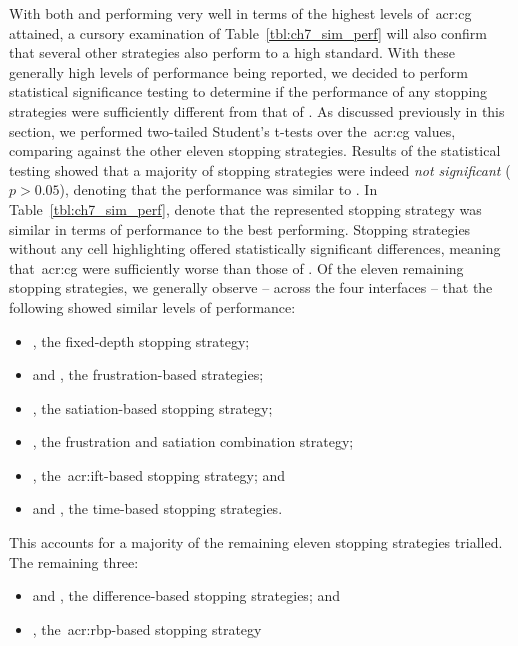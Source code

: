 With both  and  performing very well in terms of the highest levels of~\gls{acr:cg} attained, a cursory examination of Table~\ref{tbl:ch7_sim_perf} will also confirm that several other strategies also perform to a high standard. With these generally high levels of performance being reported, we decided to perform statistical significance testing to determine if the performance of any stopping strategies were sufficiently different from that of . As discussed previously in this section, we performed two-tailed Student's t-tests over the~\gls{acr:cg} values, comparing  against the other eleven stopping strategies. Results of the statistical testing showed that a majority of stopping strategies were indeed \emph{not significant} ($p>0.05$), denoting that the performance was similar to . In Table~\ref{tbl:ch7_sim_perf},  denote that the represented stopping strategy was similar in terms of performance to the best performing. Stopping strategies without any cell highlighting offered statistically significant differences, meaning that~\gls{acr:cg} were sufficiently worse than those of . Of the eleven remaining stopping strategies, we generally observe -- across the four interfaces -- that the following showed similar levels of performance:

\begin{itemize}
    \item{, the fixed-depth stopping strategy;}
    \item{ and , the frustration-based strategies;}
    \item{, the satiation-based stopping strategy;}
    \item{, the frustration and satiation combination strategy;}
    \item{, the~\gls{acr:ift}-based stopping strategy; and}
    \item{ and , the time-based stopping strategies.}
\end{itemize}

This accounts for a majority of the remaining eleven stopping strategies trialled. The remaining three:

\begin{itemize}
    \item{ and , the difference-based stopping strategies; and}
    \item{, the~\gls{acr:rbp}-based stopping strategy}
\end{itemize}

